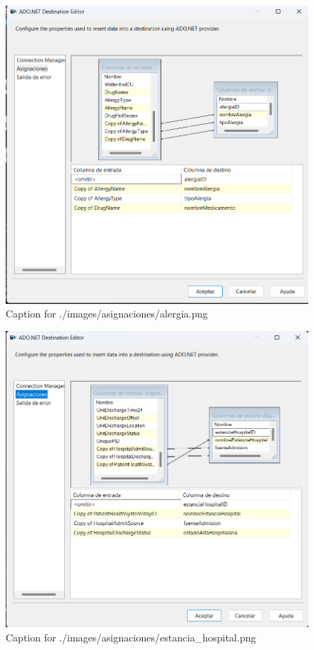 \documentclass{article}
\begin{document}
\begin{figure}[H]
  \centering
  \includegraphics[width=\linewidth]{./images/asignaciones/alergia.png}
  \caption{Caption for ./images/asignaciones/alergia.png}
\end{figure}
\begin{figure}[H]
  \centering
  \includegraphics[width=\linewidth]{./images/asignaciones/estancia_hospital.png}
  \caption{Caption for ./images/asignaciones/estancia_hospital.png}
\end{figure}
\end{document}
